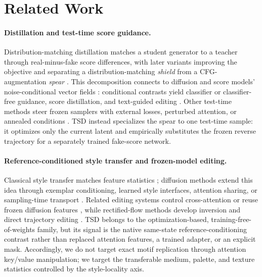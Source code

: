 \documentclass[letterpaper]{article} %
\begin{document}
\section{Related Work}

\paragraph{Distillation and test-time score guidance.}
Distribution-matching distillation matches a student generator to a teacher
through real-minus-fake score differences, with later variants improving the
objective and separating a distribution-matching \emph{shield} from a
CFG-augmentation \emph{spear}
\citep{yin2024dmd,yin2024dmd2,liu2025decoupled}. This decomposition connects
to diffusion and score models' noise-conditional vector fields
\citep{ho2020ddpm,song2021sde}: conditional contrasts yield classifier or
classifier-free guidance, score distillation, and text-guided editing
\citep{dhariwal2021diffusion,ho2022cfg,poole2023dreamfusion,hertz2023dds,
nam2024cds,chinchuthakun2025lusd}.
Other test-time methods steer frozen samplers with external losses, perturbed
attention, or annealed conditions
\citep{bansal2023universal,ahn2024pag,hong2024seg,sadat2024cads}. TSD instead
specializes the spear to one test-time sample: it optimizes only the current
latent and empirically substitutes the frozen reverse trajectory for a
separately trained fake-score network.

\paragraph{Reference-conditioned style transfer and frozen-model editing.}
Classical style transfer matches feature statistics
\citep{gatys2016style,huang2017adain}; diffusion methods extend this idea
through exemplar conditioning, learned style interfaces, attention sharing,
or sampling-time transport
\citep{yang2023paint,sohn2023styledrop,ye2023ipadapter,hertz2024stylealigned,
chung2024styleinjection,deng2024zstar,wang2024instantstyle,xu2025stylessp,
he2025semantix,rout2025rbmodulation}. Related editing systems control cross-attention or reuse
frozen diffusion features \citep{hertz2023prompt,tumanyan2023plugplay}, while
rectified-flow methods develop inversion and direct trajectory editing
\citep{rout2025rfinversion,kulikov2025flowedit}. TSD belongs to the
optimization-based, training-free-of-weights family, but its signal is the
native same-state reference-conditioning contrast rather than replaced
attention features, a trained adapter, or an explicit mask. Accordingly, we
do not target exact motif replication through attention key/value
manipulation; we target the transferable medium, palette, and texture
statistics controlled by the style-locality axis.
\end{document}
